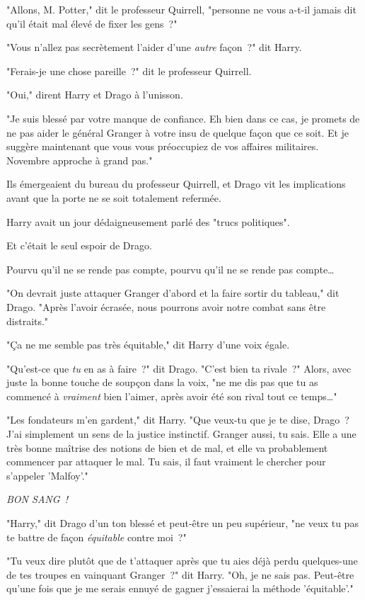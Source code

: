 "Allons, M. Potter," dit le professeur Quirrell, "personne ne vous a-t-il jamais dit qu'il était mal élevé de fixer les gens~?"

"Vous n'allez pas secrètement l'aider d'une \emph{autre} façon~?" dit Harry.

"Ferais-je une chose pareille~?" dit le professeur Quirrell.

"Oui," dirent Harry et Drago à l'unisson.

"Je suis blessé par votre manque de confiance. Eh bien dans ce cas, je promets de ne pas aider le général Granger à votre insu de quelque façon que ce soit. Et je suggère maintenant que vous vous préoccupiez de vos affaires militaires. Novembre approche à grand pas."

\later

Ils émergeaient du bureau du professeur Quirrell, et Drago vit les implications avant que la porte ne se soit totalement refermée.

Harry avait un jour dédaigneusement parlé des "trucs politiques".

Et c'était le seul espoir de Drago.

Pourvu qu'il ne se rende pas compte, pourvu qu'il ne se rende pas compte…

"On devrait juste attaquer Granger d'abord et la faire sortir du tableau," dit Drago. "Après l'avoir écrasée, nous pourrons avoir notre combat sans être distraits."

"Ça ne me semble pas très équitable," dit Harry d'une voix égale.

"Qu'est-ce que \emph{tu} en as à faire~?" dit Drago. "C'est bien ta rivale~?" Alors, avec juste la bonne touche de soupçon dans la voix, "ne me dis pas que tu as commencé à \emph{vraiment} bien l'aimer, après avoir été son rival tout ce temps…"

"Les fondateurs m'en gardent," dit Harry. "Que veux-tu que je te dise, Drago~? J'ai simplement un sens de la justice instinctif. Granger aussi, tu sais. Elle a une très bonne maîtrise des notions de bien et de mal, et elle va probablement commencer par attaquer le mal. Tu sais, il faut vraiment le chercher pour s'appeler 'Malfoy'."

\emph{BON SANG~!}

"Harry," dit Drago d'un ton blessé et peut-être un peu supérieur, "ne veux tu pas te battre de façon \emph{équitable} contre moi~?"

"Tu veux dire plutôt que de t'attaquer après que tu aies déjà perdu quelques-une de tes troupes en vainquant Granger~?" dit Harry. "Oh, je ne sais pas. Peut-être qu'une fois que je me serais ennuyé de gagner j'essaierai la méthode 'équitable'."

